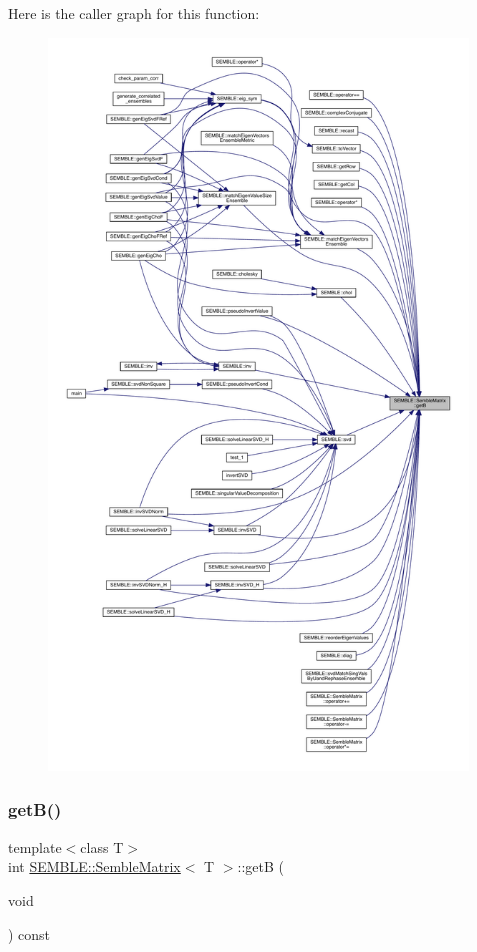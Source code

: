 Here is the caller graph for this function\+:
\nopagebreak
\begin{figure}[H]
\begin{center}
\leavevmode
\includegraphics[height=550pt]{df/d87/structSEMBLE_1_1SembleMatrix_aecff047627ee656c5836dcdf873c8ad6_icgraph}
\end{center}
\end{figure}
\mbox{\label{structSEMBLE_1_1SembleMatrix_aecff047627ee656c5836dcdf873c8ad6}} 
\subsubsection{\texorpdfstring{getB()}{getB()}\hspace{0.1cm}{\footnotesize\ttfamily [2/2]}}
{\footnotesize\ttfamily template$<$class T$>$ \\
int \mbox{\hyperlink{structSEMBLE_1_1SembleMatrix}{S\+E\+M\+B\+L\+E\+::\+Semble\+Matrix}}$<$ T $>$\+::getB (\begin{DoxyParamCaption}\item[{void}]{ }\end{DoxyParamCaption}) const\hspace{0.3cm}{\ttfamily [inline]}}

